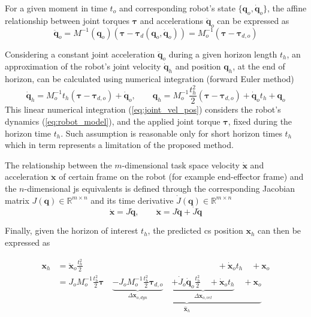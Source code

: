 For a given moment in time $t_o$ and corresponding robot's state $\{\bm{q}_o,\dot{\bm{q}}_o\}$, the affine relationship between joint torques $\bm{\tau}$ and accelerations $\ddot{\bm{q}}_{o}$ can be expressed as
\begin{equation}
    \ddot{\bm{q}}_{o} = M^{-1}(\bm{q}_o)(\bm{\tau} - \bm{\tau}_d(\bm{q}_o,\dot{\bm{q}}_o)) = M_o^{-1}(\bm{\tau} - \bm{\tau}_{d,o})
\end{equation}

Considering a constant joint acceleration $\ddot{\bm{q}}_{o}$ during a given horizon length $t_h$, an approximation of the robot's joint velocity $\dot{\bm{q}}_{h}$ and position $\bm{q}_{h}$, at the end of horizon, can be calculated using numerical integration (forward Euler method) 
\begin{equation}
    \dot{\bm{q}}_{h} = M_o^{-1}t_h(\bm{\tau} - \bm{\tau}_{d,o}) + \dot{\bm{q}}_{o}, \qquad \bm{q}_{h} = M_o^{-1}\frac{t_h^2}{2}(\bm{\tau} - \bm{\tau}_{d,o}) + \dot{\bm{q}}_{o}t_h + \bm{q}_{o}
    \label{eq:joint_vel_pos}
\end{equation}
This linear numerical integration (\ref{eq:joint_vel_pos}) considers the robot's dynamics (\ref{eq:robot_model}), and the applied joint torque $\bm{\tau}$, fixed during the horizon time $t_h$. Such assumption is reasonable only for short horizon times $t_h$ which in term represents a limitation of the proposed method.

The relationship between the $m$-dimensional task space velocity $\dot{\bm{x}}$ and acceleration $\ddot{\bm{x}}$ of certain frame on the robot (for example end-effector frame) and the $n$-dimensional \gls{js} equivalents is defined through the corresponding Jacobian matrix $J(\bm{q})\in\mathbb{R}^{m\times n}$ and its time derivative $\dot{J}(\bm{q})\in\mathbb{R}^{m\times n}$
\begin{equation}
    \dot{\bm{x}} = J \dot{\bm{q}}, \qquad  \ddot{\bm{x}} = J \ddot{\bm{q}} + \dot{J} \dot{\bm{q}}
\end{equation}

Finally, given the horizon of interest $t_h$, the predicted \gls{cs} position $\bm{x}_{h}$ can then be expressed as

\begin{equation}
\begin{split}
    {\bm{x}}_{h} &= \ddot{\bm{x}}_o\frac{t_h^2}{2}   \qquad\qquad\qquad\qquad\qquad\qquad\qquad\qquad+\dot{\bm{x}}_ot_h \quad +\!  \bm{x}_o\\
    &=  J_o M_o^{-1}\frac{t_h^2}{2}\bm{\tau} \quad \underbrace{\underbrace{-
    J_o M_o^{-1}\frac{t_h^2}{2}\bm{\tau}_{d,o}}_{\Delta \bm{x}_{o,dyn}}  \quad \underbrace{ +\dot{J}_o \dot{\bm{q}}_o\frac{t_h^2}{2} \quad+ \dot{\bm{x}}_ot_h}_{\Delta \bm{x}_{o,vel}} \quad + \bm{x}_{o} }_{\hat{\bm{x}}_{h}}
    \end{split}
    \label{eq:pred_pos}
\end{equation}

